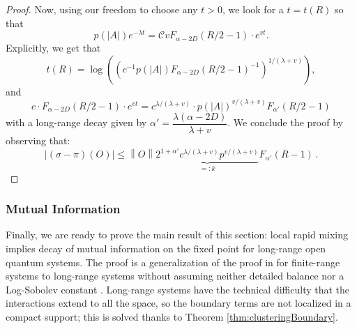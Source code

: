\documentclass[11pt]{article}
\numberwithin{equation}{section}
\numberwithin{figure}{section}
\numberwithin{table}{section}
\theoremstyle{definition}
\theoremstyle{plain}
\theoremstyle{remark}
\newcommand{\norm}[1]{\left\lVert#1\right\rVert}
\newcommand{\abs}[1]{\left \vert#1\right\vert}
\begin{document}
\begin{proof}
    Now, using our freedom to choose any $t>0$, we look for a $t=t(R)$ so that\[p(\abs{A}) e^{-\lambda t}=\mathcal{C}v F_{\alpha-2D}(R/2-1) \cdot e^{vt}.\] Explicitly, we get that
    \begin{equation}
        t(R)=\log \left(  (c^{-1}p(\abs{A})F_{\alpha-2D}(R/2-1)^{-1})^{1/(\lambda+v)}  \right),
    \end{equation}
    and
    \begin{equation}
        c\cdot F_{\alpha-2D}(R/2-1) \cdot e^{vt}=c^{\lambda/(\lambda+v)}\cdot p(\abs{A})^{v/(\lambda +v)} F_{\alpha '}(R/2-1)
    \end{equation}
    with a long-range decay given by $\alpha'=\dfrac{\lambda(\alpha-2D)}{\lambda +v}$.
    We  conclude the proof by observing that:
    \begin{equation}
         \abs{(\sigma-\pi)(O)}\leq \norm{O} \underbrace{ 2^{1+\alpha'}c^{\lambda/(\lambda+v)} p^{v/(\lambda +v)} }_{=: k}F_{\alpha '}(R-1)\,.
    \end{equation}
\end{proof}


\subsubsection{Mutual Information} \label{sec:MI}

Finally, we are ready to prove the main result of this section: local rapid mixing implies decay of mutual information on the fixed point for long-range open quantum systems. The proof is a generalization of the proof in \cite{kastoryano_rapid_2013} for finite-range systems to long-range systems without assuming neither detailed balance nor a Log-Sobolev constant \cite{KasTem13}. Long-range systems have the technical difficulty that the interactions extend to all the space, so the boundary terms are not localized in a compact support; this is solved thanks to Theorem \ref{thm:clusteringBoundary}.

\medskip
\end{document}
